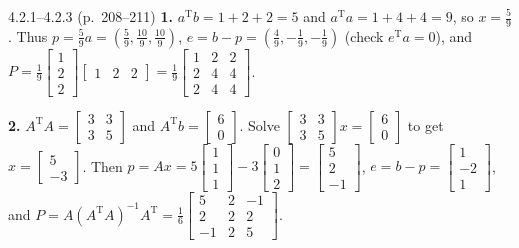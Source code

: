 \documentclass[11pt,a4paper,openany,oneside]{book}
\def\vect#1{#1}%
\def\uv#1{#1}%
\def\mathbf#1{#1}%
\newcommand{\vect}[1]{\mathbf{#1}}
\newcommand{\uv}[1]{\hat{\mathbf{#1}}}
\newcommand{\T}{\mathrm{T}}
\numberwithin{equation}{chapter}
\begin{document}
\vfill
\begin{pageend_sol}{4.2.1--4.2.3 (p.\ 208--211)}
\textbf{1.} $\vect{a}^\T\vect{b} = 1+2+2 = 5$ and $\vect{a}^\T\vect{a} = 1+4+4 = 9$, so $\uv{x} = \frac{5}{9}$. Thus $\vect{p} = \frac{5}{9}\vect{a} = \left(\frac{5}{9}, \frac{10}{9}, \frac{10}{9}\right)$, $\vect{e} = \vect{b}-\vect{p} = \left(\frac{4}{9}, -\frac{1}{9}, -\frac{1}{9}\right)$ (check $\vect{e}^\T\vect{a} = 0$), and $P = \frac{1}{9}\begin{bmatrix}1\\2\\2\end{bmatrix}\begin{bmatrix}1 & 2 & 2\end{bmatrix} = \frac{1}{9}\begin{bmatrix}1&2&2\\2&4&4\\2&4&4\end{bmatrix}$.

\textbf{2.} $A^\T A = \begin{bmatrix}3 & 3\\3 & 5\end{bmatrix}$ and $A^\T\vect{b} = \begin{bmatrix}6\\0\end{bmatrix}$. Solve $\begin{bmatrix}3 & 3\\3 & 5\end{bmatrix}\uv{\vect{x}} = \begin{bmatrix}6\\0\end{bmatrix}$ to get $\uv{\vect{x}} = \begin{bmatrix}5\\-3\end{bmatrix}$. Then $\vect{p} = A\uv{\vect{x}} = 5\begin{bmatrix}1\\1\\1\end{bmatrix} - 3\begin{bmatrix}0\\1\\2\end{bmatrix} = \begin{bmatrix}5\\2\\-1\end{bmatrix}$, $\vect{e} = \vect{b}-\vect{p} = \begin{bmatrix}1\\-2\\1\end{bmatrix}$, and $P = A(A^\T A)^{-1}A^\T = \frac{1}{6}\begin{bmatrix}5 & 2 & -1\\2 & 2 & 2\\-1 & 2 & 5\end{bmatrix}$.
\end{pageend_sol}
\clearpage
\end{document}
